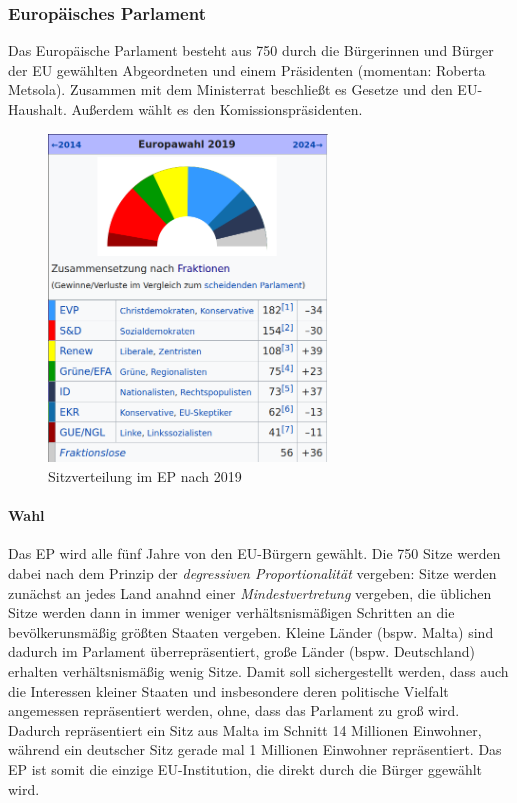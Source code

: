 \documentclass{article}
\begin{document}
	\subsubsection{Europäisches Parlament}
	Das Europäische Parlament besteht aus 750 durch die Bürgerinnen und Bürger der EU gewählten Abgeordneten und einem Präsidenten (momentan: Roberta Metsola). Zusammen mit dem Ministerrat beschließt es Gesetze und den EU-Haushalt. Außerdem wählt es den Komissionspräsidenten.

	\begin{figure}
		\centering
  		\includegraphics[width=20em]{eu_ep_2019.png}
  		\caption{Sitzverteilung im EP nach 2019}
  		\label{fig:eu_2019}
	\end{figure}

	\paragraph{Wahl}
	Das EP wird alle fünf Jahre von den EU-Bürgern gewählt. Die 750 Sitze werden dabei nach dem Prinzip der \textit{degressiven Proportionalität} vergeben: Sitze werden zunächst an jedes Land anahnd einer \textit{Mindestvertretung} vergeben, die üblichen Sitze werden dann in immer weniger verhältsnismäßigen Schritten an die bevölkerunsmäßig größten Staaten vergeben. Kleine Länder (bspw. Malta) sind dadurch im Parlament überrepräsentiert, große Länder (bspw. Deutschland) erhalten verhältsnismäßig wenig Sitze. Damit soll sichergestellt werden, dass auch die Interessen kleiner Staaten und insbesondere deren politische Vielfalt angemessen repräsentiert werden, ohne, dass das Parlament zu groß wird. Dadurch repräsentiert ein Sitz aus Malta im Schnitt 14 Millionen Einwohner, während ein deutscher Sitz gerade mal 1 Millionen Einwohner repräsentiert. Das EP ist somit die einzige EU-Institution, die direkt durch die Bürger ggewählt wird.
\end{document}
